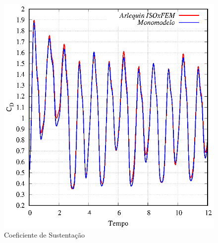 \documentclass[tese_patricia]{subfiles}
\begin{document}
\begin{figure}[htb!]
	\centering 
	\includegraphics[scale=1.0,trim=0cm 0cm 0cm 0cm, clip=true]{Imagens/Cap6/LiftMov.eps}	
	\caption{Coeficiente de Sustentação}
	\label{fig:AeroLiftMov}
\end{figure}
\end{document}

